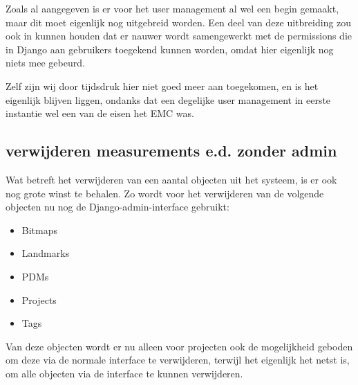 Zoals al aangegeven is er voor het user management al wel een begin gemaakt, maar dit moet eigenlijk nog uitgebreid worden.
Een deel van deze uitbreiding zou ook in kunnen houden dat er nauwer wordt samengewerkt met de permissions die in Django aan gebruikers toegekend kunnen worden, omdat hier eigenlijk nog niets mee gebeurd.

Zelf zijn wij door tijdsdruk hier niet goed meer aan toegekomen, en is het eigenlijk blijven liggen, ondanks dat een degelijke user management in eerste instantie wel een van de eisen het EMC was.

\subsection{verwijderen measurements e.d. zonder admin}
Wat betreft het verwijderen van een aantal objecten uit het systeem, is er ook nog grote winst te behalen.
Zo wordt voor het verwijderen van de volgende objecten nu nog de Django-admin-interface gebruikt:
\begin{itemize}
  \item Bitmaps
  \item Landmarks
  \item PDMs
  \item Projects
  \item Tags
\end{itemize}
Van deze objecten wordt er nu alleen voor projecten ook de mogelijkheid geboden om deze via de normale interface te verwijderen, terwijl het eigenlijk het netst is, om alle objecten via de interface te kunnen verwijderen.

